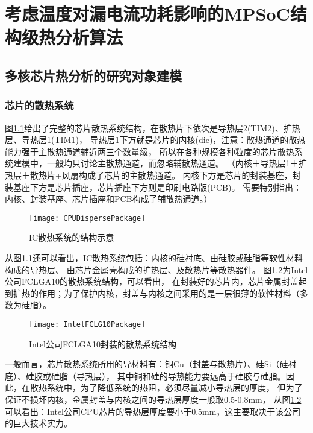

\chapter{考虑温度对漏电流功耗影响的MPSoC结构级热分析算法}
\label{cha:SSTA}


\section{多核芯片热分析的研究对象建模}
\label{sec:SSTAbasic}

\subsection{芯片的散热系统}
图\ref{fig:cpu-disperse-package}给出了完整的芯片散热系统结构，在散热片下依次是导热层2(TIM2)、扩热层、导热层1(TIM1)， 导热层1下方就是芯片的内核(die)，注意：散热通道的散热能力强于主散热通道辅近两三个数量级， 所以在各种规模各种粒度的芯片散热系统建模中，一般均只讨论主散热通道，而忽略辅散热通道。 （内核＋导热层1＋扩热层＋散热片+风扇构成了芯片的主散热通道。 内核下方是芯片的封装基座，封装基座下方是芯片插座，芯片插座下方则是印刷电路版(PCB)。 需要特别指出：内核、封装基座、芯片插座和PCB构成了辅散热通道。）

\begin{figure}[H]
  \centering
  \texttt{[image: CPUDispersePackage]}
  \caption{IC散热系统的结构示意}
  \label{fig:cpu-disperse-package}
\end{figure}

从图\ref{fig:cpu-disperse-package}还可以看出，IC散热系统包括：内核的硅衬底、由硅胶或硅脂等软性材料构成的导热层、 由芯片金属壳构成的扩热层、及散热片等散热器件。 图\ref{fig:intel-fclg-package}为Intel公司FCLGA10的散热系统结构，可以看出， 在封装好的芯片内，芯片金属封盖起到扩热的作用；为了保护内核，封盖与内核之间采用的是一层很薄的软性材料（多数为硅脂）。

\begin{figure}[H]
  \centering
  \texttt{[image: IntelFCLG10Package]}
  \caption{Intel公司FCLGA10封装的散热系统结构}
  \label{fig:intel-fclg-package}
\end{figure}

一般而言，芯片散热系统所用的导材料有：铜Cu（封盖与散热片）、硅Si（硅衬底）、硅胶或硅脂（导热层）， 其中铜和硅的导热能力要远高于硅胶与硅脂。因此，在散热系统中，为了降低系统的热阻，必须尽量减小导热层的厚度， 但为了保证不损坏内核，金属封盖与内核之间的导热层厚度一般取0.5-0.8mm， 从图\ref{fig:intel-fclg-package}可以看出：Intel公司CPU芯片的导热层厚度要小于0.5mm，这主要取决于该公司的巨大技术实力。


